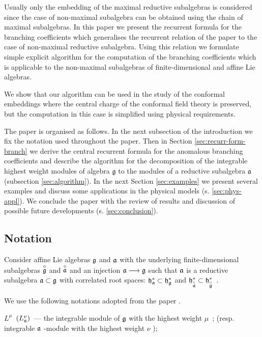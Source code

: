 \documentclass[a4paper,12pt]{article}
\theoremstyle{definition} \newtheorem{Def}{Definition}
\begin{document}
Usually only the embedding of the maximal reductive subalgebras is considered since the case of non-maximal subalgebra can be obtained using the chain of maximal subalgebras. In this paper we present the recurrent formula for the branching coefficients which generalises the recurrent relation of the paper \cite{ilyin812pbc} to the case of non-maximal reductive subalgebra. Using this relation we formulate simple explicit algorithm for the computation of the branching coefficients which is applicable to the non-maximal subalgebras of finite-dimensional and affine Lie algebras.

We show that our algorithm can be used in the study of the conformal embeddings where the central charge of the conformal field theory is preserved, but the computation in this case is simplified using physical requirements.

The paper is organised as follows. In the next subsection of the introduction we fix the notation used throughout the paper. Then in Section \ref{sec:recurr-form-branch} we derive the central recurrent formula for the anomalous branching coefficients and describe the algorithm for the decomposition of the integrable highest weight modules of algebra $\mathfrak{g}$ to the modules of a reductive subalgebra $\mathfrak{a}$ (subsection \ref{sec:algorithm}). In the next Section \ref{sec:examples} we present several examples and discuss some applications in the physical models (s. \ref{sec:phys-appl}). We conclude the paper with the review of results and discussion of possible future developments (s. \ref{sec:conclusion}).

\subsection{Notation}
\label{sec:notation}

Consider affine Lie algebras $\frak{g}$ and $\frak{a}$ with the
underlying finite-dimensional subalgebras $\overset{\circ }{\frak{g}}$ and $%
\overset{\circ }{\frak{a}}$ and an injection $\frak{a}\longrightarrow \frak{g%
}$ such that $\frak{a}$ is a reductive subalgebra $\frak{a\subset g}$ with
correlated root spaces: $\frak{h}_{\frak{a}}^{\ast }\subset \frak{h}_{\frak{g%
}}^{\ast }$ and $\frak{h}_{\overset{\circ }{\frak{a}}}^{\ast }\subset \frak{h%
}_{\overset{\circ }{\frak{g}}}^{\ast }$\ .

We use the following notations adopted from the paper \cite{ilyin812pbc}.

$L^{\mu }$\ $\left( L_{\frak{a}}^{\nu }\right) $\ --- the integrable module
of $\frak{g}$ with the highest weight $\mu $\ ; (resp. integrable $\frak{a}$
-module with the highest weight $\nu $ );
\end{document}
